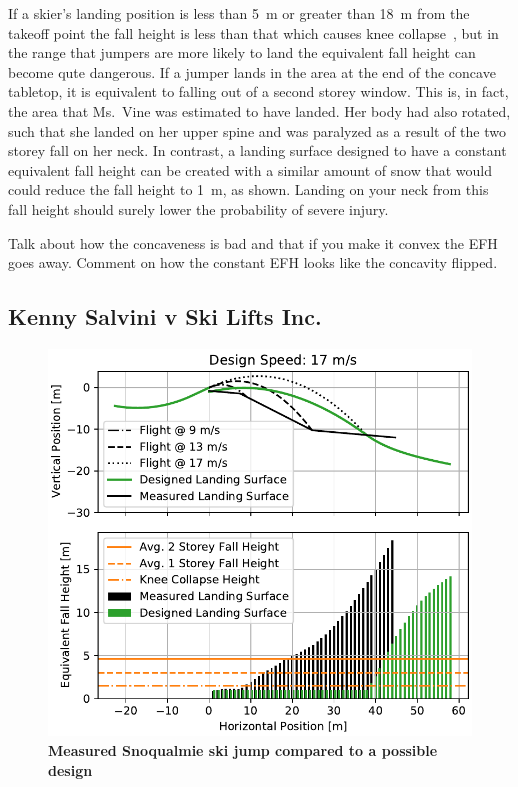\documentclass{article}
\begin{document}
If a skier's landing position is less than 5~\si{\meter} or greater than
18~\si{\meter} from the takeoff point the fall height is less than that which
causes knee collapse~\cite{Minetti1998}, but in the range that jumpers are more
likely to land the equivalent fall height can become qute dangerous. If a
jumper lands in the area at the end of the concave tabletop, it is equivalent
to falling out of a second storey window. This is, in fact, the area that
Ms.~Vine was estimated to have landed. Her body had also rotated, such that she
landed on her upper spine and was paralyzed as a result of the two storey fall
on her neck. In contrast, a landing surface designed to have a constant
equivalent fall height can be created with a similar amount of snow that would
could reduce the fall height to 1~\si{\meter}, as shown. Landing on your neck
from this fall height should surely lower the probability of severe injury.

Talk about how the concaveness is bad and that if you make it convex the EFH goes away. Comment on how the constant EFH looks like the concavity flipped.


\subsection{Kenny Salvini v Ski Lifts Inc.}
%
\begin{figure}
  \centering
  \includegraphics[width=5.25in]{figures/salvini-v-snoqualmie.pdf}
  \caption{\textbf{Measured Snoqualmie ski jump compared to a possible design}}
  \label{fig:salvini-v-snoqualmie}
\end{figure}
\end{document}
